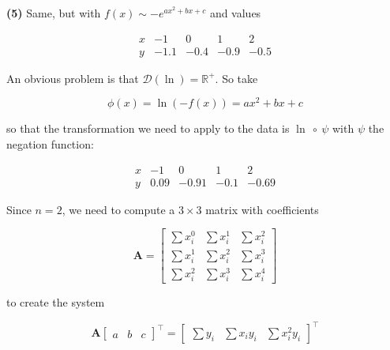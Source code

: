 \documentclass[12pt]{article}
\theoremstyle{definition}
\begin{document}
\pagebreak 

\begin{shaded}
    \textbf{(5)} Same, but with $f(x) \sim -e^{ax^2 + bx + c}$ and values


     \begin{equation*}
    \begin{array}{c|c|c|c|c}
        x & -1 & 0 & 1 & 2\\ 
        y & -1.1 & -0.4 & -0.9 & -0.5
     \end{array}
     \end{equation*}
\end{shaded}

An obvious problem is that $\mathcal{D}(\ln) = \mathbb{R}^+$. So take 

\begin{equation*}
    \phi(x) = \ln\left( - f(x) \right) = ax^2 + bx + c
\end{equation*}

so that the transformation we need to apply to the data is $\ln ~ \circ ~\psi$ with
$\psi$ the negation function:


     \begin{equation*}
    \begin{array}{c|c|c|c|c}
        x & -1 & 0 & 1 & 2\\ 
        y & 0.09 & -0.91 & -0.1 & -0.69
     \end{array}
     \end{equation*}

Since $n = 2$, we need to compute a $3\times 3$ matrix with coefficients 

\begin{equation*}
    \textbf{A} = \begin{bmatrix} 
        \sum x_i^0 & \sum x_i^1 &\sum x_i^2 \\ 
    \sum x_i^1 & \sum x_i^2 & \sum x_i^3 \\ 
    \sum x_i^2 &\sum x_i^3 &\sum x_i^4
    \end{bmatrix} 
\end{equation*}

to create the system 

\begin{equation*}
    \textbf{A} \begin{bmatrix} 
        a & b & c 
    \end{bmatrix}^\top = \begin{bmatrix} 
        \sum y_i & \sum x_iy_i & \sum x_i^2 y_i 
    \end{bmatrix}^\top
\end{equation*}
\end{document}
